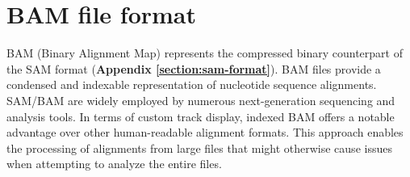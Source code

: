 \documentclass[a4paper, titlepage, openright]{book}
\begin{document}
\begin{table}[!]
    \centering
    \caption[SAM file format fields]{\textbf{SAM file format fields.} Description of SAM format fields}
    \label{tab:sam-file}
\end{table}

\section{BAM file format}\label{section:bam-format}
BAM (Binary Alignment Map) \citep{barnett2011bamtools} represents the compressed binary counterpart of the SAM format (\textbf{Appendix \ref{section:sam-format}}). BAM files provide a condensed and indexable representation of nucleotide sequence alignments. SAM/BAM are widely employed by numerous next-generation sequencing and analysis tools. In terms of custom track display, indexed BAM offers a notable advantage over other human-readable alignment formats. This approach enables the processing of alignments from large files that might otherwise cause issues when attempting to analyze the entire files.
\end{document}
